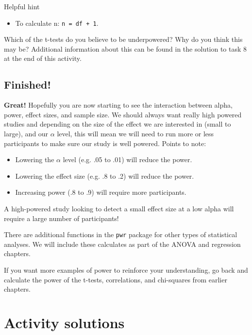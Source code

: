 \documentclass[]{book}
\providecommand{\tightlist}{%
  \setlength{\itemsep}{0pt}\setlength{\parskip}{0pt}}
\begin{document}
Helpful hint

\begin{itemize}
\tightlist
\item
  To calculate n: \texttt{n\ =\ df\ +\ 1}.
\end{itemize}

Which of the t-tests do you believe to be underpowered? Why do you think this may be? Additional information about this can be found in the solution to task 8 at the end of this activity.

\hypertarget{finished-8}{%
\subsection{Finished!}\label{finished-8}}

\textbf{Great!} Hopefully you are now starting to see the interaction between alpha, power, effect sizes, and sample size. We should always want really high powered studies and depending on the size of the effect we are interested in (small to large), and our \(\alpha\) level, this will mean we will need to run more or less participants to make sure our study is well powered. Points to note:

\begin{itemize}
\tightlist
\item
  Lowering the \(\alpha\) level (e.g. .05 to .01) will reduce the power.
\item
  Lowering the effect size (e.g. .8 to .2) will reduce the power.
\item
  Increasing power (.8 to .9) will require more participants.
\end{itemize}

A high-powered study looking to detect a small effect size at a low alpha will require a large number of participants!

There are additional functions in the \texttt{pwr} package for other types of statistical analyses. We will include these calculates as part of the ANOVA and regression chapters.

If you want more examples of power to reinforce your understanding, go back and calculate the power of the t-tests, correlations, and chi-squares from earlier chapters.

\hypertarget{activity-solutions-6}{%
\section{Activity solutions}\label{activity-solutions-6}}
\end{document}
